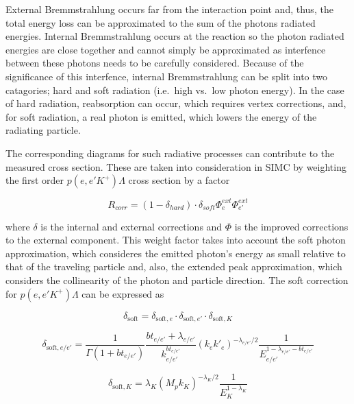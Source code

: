\documentclass[
]{report}
\begin{document}
External Bremmstrahlung occurs far from the interaction point and, thus,
the total energy loss can be approximated to the sum of the photons
radiated energies. Internal Bremmstrahlung occurs at the reaction so the
photon radiated energies are close together and cannot simply be
approximated as interfence between these photons needs to be carefully
considered. Because of the significance of this interfence, internal
Bremmstrahlung can be split into two catagories; hard and soft radiation
(i.e.~high vs.~low photon energy). In the case of hard radiation,
reabsorption can occur, which requires vertex corrections, and, for soft
radiation, a real photon is emitted, which lowers the energy of the
radiating particle.

The corresponding diagrams for such radiative processes can contribute
to the measured cross section. These are taken into consideration in
SIMC by weighting the first order \(p(e,e'K^+)\Lambda\) cross section by
a factor

\begin{equation} 
  R_{corr}=(1-\delta_{hard})\cdot\delta_{soft}\Phi^{ext}_e\Phi^{ext}_{e'}
  \label{eq:weight_factor} 
\end{equation}

\noindent where \(\delta\) is the internal and external corrections and
\(\Phi\) is the improved corrections to the external component. This
weight factor takes into account the soft photon approximation, which
consideres the emitted photon's energy as small relative to that of the
traveling particle and, also, the extended peak approximation, which
considers the collinearity of the photon and particle direction. The
soft correction for \(p(e,e'K^+)\Lambda\) can be expressed as

\begin{equation} 
  \delta_{\text{soft}}=\delta_{\text{soft},e}\cdot\delta_{\text{soft},e'}\cdot\delta_{\text{soft},K}
  \label{eq:soft_corr} 
\end{equation}

\begin{equation} 
  \delta_{\text{soft},e/e'}=\frac{1}{\Gamma(1+bt_{e/e'})}\frac{bt_{e/e'}+\lambda_{e/e'}}{k^{bt_{e/e'}}_{e/e'}}(k_ek'_e)^{-\lambda_{e/e'}/2}\frac{1}{{E}^{1-\lambda_{e/e'}-bt_{e/e'}}_{e/e'}}
  \label{eq:soft_corr_e} 
\end{equation}

\begin{equation} 
  \delta_{\text{soft},K}=\lambda_K(M_pk_K)^{-\lambda_K/2}\frac{1}{E^{1-\lambda_K}_K}
  \label{eq:soft_corr_k} 
\end{equation}
\end{document}
